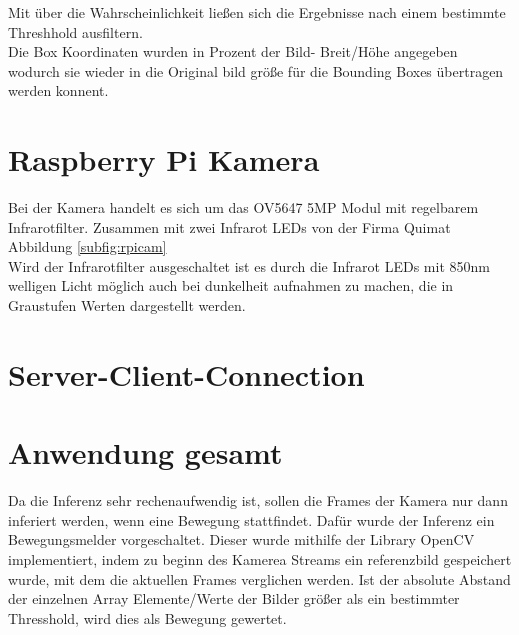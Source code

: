 Mit über die Wahrscheinlichkeit ließen sich die Ergebnisse 
nach einem bestimmte Threshhold ausfiltern.\\
Die Box Koordinaten wurden in Prozent der Bild- Breit/Höhe 
angegeben wodurch sie wieder in die Original bild größe 
für die Bounding Boxes übertragen werden konnent.




\section{Raspberry Pi Kamera}\label{sec:raspicam}


Bei der Kamera handelt es sich um das OV5647 5MP Modul mit regelbarem 
Infrarotfilter. Zusammen mit zwei Infrarot LEDs von der Firma Quimat 
Abbildung \ref{subfig:rpicam}
\\
Wird der Infrarotfilter ausgeschaltet ist es durch die Infrarot LEDs mit 
850nm welligen Licht möglich auch bei dunkelheit aufnahmen zu machen, 
die in Graustufen Werten dargestellt werden.




\section{Server-Client-Connection}\label{sec:serverclient}





\section{Anwendung gesamt}\label{sec:ka}

Da die Inferenz sehr rechenaufwendig ist, sollen die Frames der Kamera nur 
dann inferiert werden, wenn eine Bewegung stattfindet. Dafür wurde der 
Inferenz ein Bewegungsmelder vorgeschaltet. Dieser wurde mithilfe der Library 
OpenCV implementiert, indem zu beginn des Kamerea Streams ein referenzbild 
gespeichert wurde, mit dem die aktuellen Frames verglichen werden. 
Ist der absolute Abstand der einzelnen Array Elemente/Werte der Bilder größer 
als ein bestimmter Thresshold, wird dies als Bewegung gewertet.






